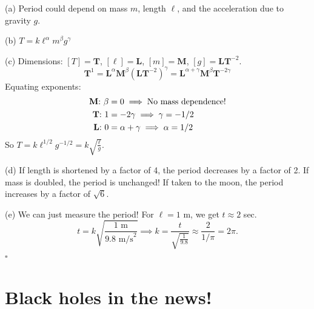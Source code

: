 \documentclass[11pt, letterpaper, openany]{book}
\newenvironment{solution}[1][Solution]{%
  \tcolorbox[blanker, breakable, left=1em,
    before skip=1em, after skip=1em,
    borderline west={2pt}{0pt}{PhysTeal},
    colback=PhysCream,
    before upper={\textcolor{PhysTeal}{\sffamily\bfseries #1.}\space}
  ]%
}{%
  \hfill\textcolor{PhysTeal}{\ensuremath{\square}}\endtcolorbox%
}
\begin{document}
\begin{solution}
(a) Period could depend on mass $m$, length $\ell$, and the acceleration due to gravity $g$.

(b) $T = k \ell^\alpha m^\beta g^\gamma$

(c) Dimensions: $[T] = \textbf{T}$, $[\ell] = \textbf{L}$, $[m] = \textbf{M}$, $[g] = \textbf{L}\textbf{T}^{-2}$.
\[ \textbf{T}^1 = \textbf{L}^\alpha \textbf{M}^\beta (\textbf{L}\textbf{T}^{-2})^\gamma = \textbf{L}^{\alpha+\gamma} \textbf{M}^\beta \textbf{T}^{-2\gamma} \]
Equating exponents:
\begin{align*}
    \text{\textbf{M}: } \beta &= 0 \implies \text{No mass dependence!} \\
    \text{\textbf{T}: } 1 &= -2\gamma \implies \gamma = -1/2 \\
    \text{\textbf{L}: } 0 &= \alpha + \gamma \implies \alpha = 1/2
\end{align*}
So $T = k \ell^{1/2} g^{-1/2} = k\sqrt{\frac{\ell}{g}}$.

(d) If length is shortened by a factor of 4, the period decreases by a factor of 2. If mass is doubled, the period is unchanged! If taken to the moon, the period increases by a factor of $\sqrt{6}$.

(e) We can just measure the period! For $\ell = 1$ m, we get $t \approx 2$ sec.
\[ t = k\sqrt{\frac{1 \text{ m}}{9.8 \text{ m/s}^2}} \implies k = \frac{t}{\sqrt{\frac{1}{9.8}}} \approx \frac{2}{1/\pi} = 2\pi. \]
\end{solution}

\section{Black holes in the news!}
\end{document}
